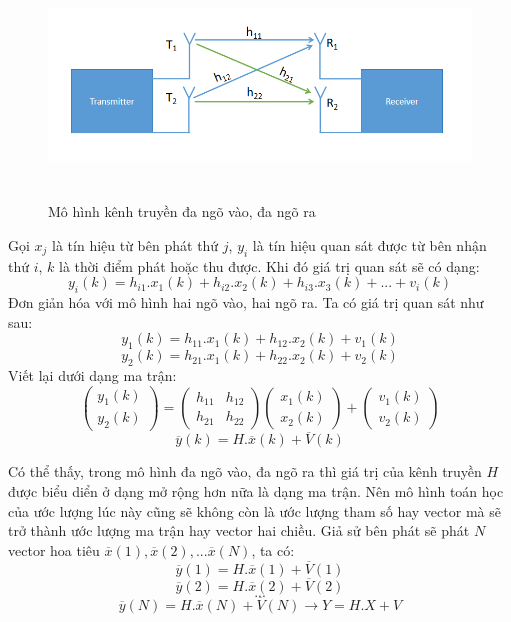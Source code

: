 \documentclass{article}
\begin{document}
\begin{figure}[h!]
    \centering
    \includegraphics[width=14cm, height =6cm]{photo/7.1.png}
    \caption{Mô hình kênh truyền đa ngõ vào, đa ngõ ra}
    \label{Hình 25}
\end{figure}
Gọi $x_j$ là tín hiệu từ bên phát thứ $j$, $y_i$ là tín hiệu quan sát được từ bên nhận thứ $i$, $k$ là thời điểm phát hoặc thu được. Khi đó giá trị quan sát sẽ có dạng:
$$y_i(k) = h_{i1}.x_1(k) + h_{i2}.x_2(k) + h_{i3}.x_3(k) + ... + v_i(k)$$
Đơn giản hóa với mô hình hai ngõ vào, hai ngõ ra. Ta có giá trị quan sát như sau:
$$y_1(k) = h_{11}.x_1(k) + h_{12}.x_2(k) + v_1(k) $$
$$ y_2(k) = h_{21}.x_1(k) + h_{22}.x_2(k) + v_2(k)$$
Viết lại dưới dạng ma trận:
$$ \begin{pmatrix}
    y_1(k)\\y_2(k)
\end{pmatrix} = \begin{pmatrix}
    h_{11}&h_{12}\\
    h_{21}&h_{22}
\end{pmatrix} \begin{pmatrix}
    x_1(k)\\x_2(k)
\end{pmatrix} + \begin{pmatrix}
    v_1(k)\\v_2(k)
\end{pmatrix}$$
$$ \overline{y}(k) = H.\overline{x}(k) + \overline{V}(k)$$

Có thể thấy, trong mô hình đa ngõ vào, đa ngõ ra thì giá trị của kênh truyền $H$ được biểu diển ở dạng mở rộng hơn nữa là dạng ma trận. Nên mô hình toán học của ước lượng lúc này cũng sẽ không còn là ước lượng tham số hay vector mà sẽ trở thành ước lượng ma trận hay vector hai chiều. Giả sử bên phát sẽ phát $N$ vector hoa tiêu $\overline{x}(1),\overline{x}(2),...\overline{x}(N)$, ta có:
$$\overline{y}(1) = H.\overline{x}(1) + \overline{V}(1) $$
$$\overline{y}(2) = H.\overline{x}(2) + \overline{V}(2)$$
$$...$$
$$\overline{y}(N) = H.\overline{x}(N) + \overline{V}(N) \rightarrow Y = H.X +V$$
\end{document}
